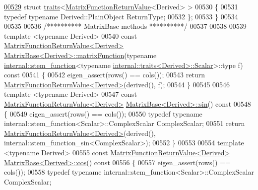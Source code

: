 \begin{DoxyCode}
\hyperlink{struct_eigen_1_1internal_1_1traits_3_01_matrix_function_return_value_3_01_derived_01_4_01_4}{00529} \textcolor{keyword}{struct }\hyperlink{struct_eigen_1_1internal_1_1traits}{traits}<\hyperlink{class_eigen_1_1_matrix_function_return_value}{MatrixFunctionReturnValue}<Derived> >
00530 \{
00531   \textcolor{keyword}{typedef} \textcolor{keyword}{typename} Derived::PlainObject ReturnType;
00532 \};
00533 \}
00534 
00535 
00536 \textcolor{comment}{/********** MatrixBase methods **********/}
00537 
00538 
00539 \textcolor{keyword}{template} <\textcolor{keyword}{typename} Derived>
00540 \textcolor{keyword}{const} \hyperlink{class_eigen_1_1_matrix_function_return_value}{MatrixFunctionReturnValue<Derived>} 
      \hyperlink{group___core___module_class_eigen_1_1_matrix_base}{MatrixBase<Derived>::matrixFunction}(\textcolor{keyword}{typename} 
      \hyperlink{struct_eigen_1_1internal_1_1stem__function}{internal::stem\_function}<\textcolor{keyword}{typename} 
      \hyperlink{struct_eigen_1_1internal_1_1traits}{internal::traits<Derived>::Scalar}>::type f)\textcolor{keyword}{ const}
00541 \textcolor{keyword}{}\{
00542   eigen\_assert(rows() == cols());
00543   \textcolor{keywordflow}{return} \hyperlink{class_eigen_1_1_matrix_function_return_value}{MatrixFunctionReturnValue<Derived>}(derived(), f);
00544 \}
00545 
00546 \textcolor{keyword}{template} <\textcolor{keyword}{typename} Derived>
00547 \textcolor{keyword}{const} \hyperlink{class_eigen_1_1_matrix_function_return_value}{MatrixFunctionReturnValue<Derived>} 
      \hyperlink{group___core___module_class_eigen_1_1_matrix_base}{MatrixBase<Derived>::sin}()\textcolor{keyword}{ const}
00548 \textcolor{keyword}{}\{
00549   eigen\_assert(rows() == cols());
00550   \textcolor{keyword}{typedef} \textcolor{keyword}{typename} internal::stem\_function<Scalar>::ComplexScalar ComplexScalar;
00551   \textcolor{keywordflow}{return} \hyperlink{class_eigen_1_1_matrix_function_return_value}{MatrixFunctionReturnValue<Derived>}(derived(), 
      internal::stem\_function\_sin<ComplexScalar>);
00552 \}
00553 
00554 \textcolor{keyword}{template} <\textcolor{keyword}{typename} Derived>
00555 \textcolor{keyword}{const} \hyperlink{class_eigen_1_1_matrix_function_return_value}{MatrixFunctionReturnValue<Derived>} 
      \hyperlink{group___core___module_class_eigen_1_1_matrix_base}{MatrixBase<Derived>::cos}()\textcolor{keyword}{ const}
00556 \textcolor{keyword}{}\{
00557   eigen\_assert(rows() == cols());
00558   \textcolor{keyword}{typedef} \textcolor{keyword}{typename} internal::stem\_function<Scalar>::ComplexScalar ComplexScalar;

\end{DoxyCode}
